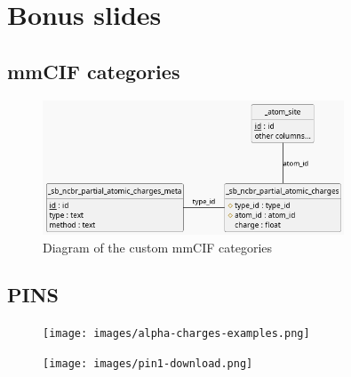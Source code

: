 \documentclass[
]{beamer}
\begin{document}
\section[Bonus slides]{Bonus slides}

\subsection[mmCIF categories]{mmCIF categories}

\begin{frame}
  \begin{figure}
    \includegraphics[width=0.8\textwidth,keepaspectratio]{images/mmcif_erd.png}
    \caption{Diagram of the custom mmCIF categories}
  \end{figure}
\end{frame}

\subsection[PINS]{PINS}

\begin{frame}
  \begin{figure}
    \texttt{[image: images/alpha-charges-examples.png]}
  \end{figure}
\end{frame}

\begin{frame}
  \begin{figure}
    \texttt{[image: images/pin1-download.png]}
  \end{figure}
\end{frame}
\end{document}
